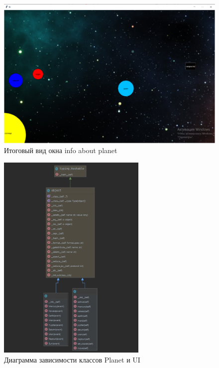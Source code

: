 \documentclass[11pt,a4paper]{report}
\begin{document}
\begin{figure}[h]
\centering
\includegraphics[width=0.78\linewidth]{1.png}
\caption{Итоговый вид окна info about planet}
\label{fig:mpr}

\end{figure}
\begin{figure}[h]
\centering
\includegraphics[width=1.0\linewidth]{3.png}
\caption{Диаграмма зависимости классов Planet и UI}
\label{fig:mpr}
\end{figure}
\end{document}
